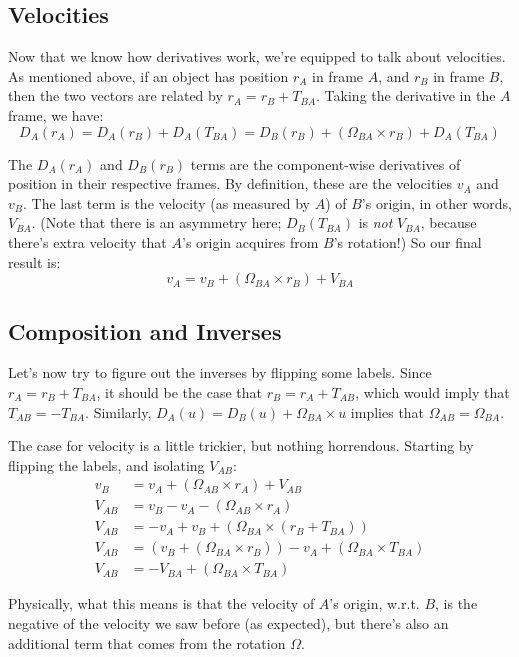 \documentclass{article}
\numberwithin{equation}{subsection}
\begin{document}
\subsection{Velocities}

Now that we know how derivatives work, we're equipped to talk about velocities. As mentioned above, if an object has position $r_A$ in frame $A$, and $r_B$ in frame $B$, then the two vectors are related by $r_A = r_B + T_{BA}$. Taking the derivative in the $A$ frame, we have:
\[ D_A (r_A) = D_A (r_B) + D_A(T_{BA}) = D_B (r_B) + (\Omega_{BA} \times r_B) + D_A (T_{BA}) \]

The $D_A (r_A)$ and $D_B (r_B)$ terms are the component-wise derivatives of position in their respective frames. By definition, these are the velocities $v_A$ and $v_B$. The last term is the velocity (as measured by $A$) of $B$'s origin, in other words, $V_{BA}$. (Note that there is an asymmetry here; $D_B (T_{BA})$ is \textit{not} $V_{BA}$, because there's extra velocity that $A$'s origin acquires from $B$'s rotation!) So our final result is:
\[ v_A = v_B + (\Omega_{BA} \times r_B) + V_{BA} \]

\subsection{Composition and Inverses}

Let's now try to figure out the inverses by flipping some labels. Since $r_A = r_B + T_{BA}$, it should be the case that $r_B = r_A + T_{AB}$, which would imply that $T_{AB} = -T_{BA}$. Similarly, $D_A(u) = D_B(u) + \Omega_{BA} \times u$ implies that $\Omega_{AB} = \Omega_{BA}$.

The case for velocity is a little trickier, but nothing horrendous. Starting by flipping the labels, and isolating $V_{AB}$:
\begin{align*}
v_B &= v_A + (\Omega_{AB} \times r_A) + V_{AB} \\
V_{AB} &= v_B - v_A - (\Omega_{AB} \times r_A) \\
V_{AB} &= -v_A + v_B + (\Omega_{BA} \times (r_B + T_{BA})) \\
V_{AB} &= (v_B + (\Omega_{BA} \times r_B)) - v_A + (\Omega_{BA} \times T_{BA}) \\
V_{AB} &= -V_{BA} + (\Omega_{BA} \times T_{BA})
\end{align*}

Physically, what this means is that the velocity of $A$'s origin, w.r.t. $B$, is the negative of the velocity we saw before (as expected), but there's also an additional term that comes from the rotation $\Omega$.
\end{document}
